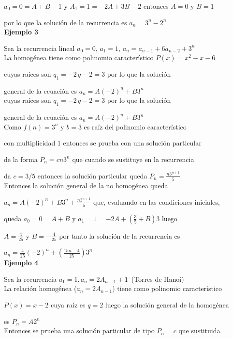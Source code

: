 \documentclass[a4paper,12pt]{report}
\begin{document}
$a_0=0=A+B-1$ y $A_1=1=-2A+3B-2$ entonces $A=0$ y $B=1$

por lo que la solución de la recurrencia es $a_n=3^n-2^n$\\

\textbf{Ejemplo 3}

Sea la recurrencia lineal $a_0=0,\, a_1=1,\, a_n=a_{n-1}+6a_{n-2}+3^n$\\

La homogénea tiene como polinomio característico $P(x)=x^2-x-6$ 

cuyas raíces son $q_1=-2\, q-2=3$ por lo que la solución 

general de la ecuación es  $a_n=A(-2)^n+B3^n$\\

cuyas raíces son $q_1=-2\, q-2=3$ por lo que la solución 

general de la ecuación es  $a_n=A(-2)^n+B3^n$\\

Como $f(n)=3^n$ y  $b=3$ es raíz del polinomio característico  

con  multiplicidad 1 entonces se prueba con una solución particular 

de la forma $P_n=cn3^n$ que cuando se sustituye en la recurrencia 

da $c=3/5$ entonces la solución particular queda $P_n=\frac{n3^{n+1}}{5}$\\

Entonces la solución general de la no homogénea queda 

$a_n=A(-2)^n+B3^n+\frac{n3^{n+1}}{5}$ que, evaluando en las condiciones iniciales,

queda $a_0=0=A+B$ y $a_1=1=-2A+(\frac{3}{5}+B)3$ luego 

$A=\frac{4}{25}$ y $B=-\frac{4}{25}$ por tanto la solución de la recurrencia es

$a_n=\frac{4}{25}(-2)^n+(\frac{15n-4}{25})3^n$\\

\textbf{Ejemplo 4}

Sea la recurrencia $a_1=1.\, a_n=2A_{n-1}+1$~(Torres de Hanoi)\\

La relación homogénea ($a_n=2A_{n-1}$) tiene como polinomio característico

$P(x)=x-2$ cuya raíz es $q=2$ luego la solución general de la homogénea 

es  $P_n=A2^n$\\

Entonces se prueba una solución particular de tipo $P_n=c$ que sustituida 
\end{document}
